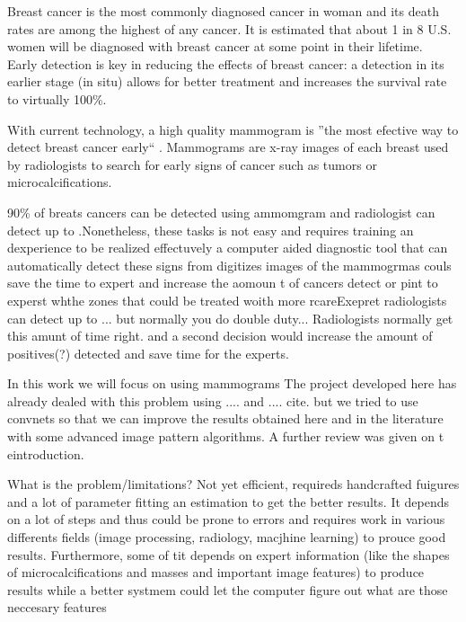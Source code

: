 Breast cancer is the most commonly diagnosed cancer in woman and its death rates are among the highest of any cancer. It is estimated that about 1 in 8 U.S. women will be diagnosed with breast cancer at some point in their lifetime.~\cite{CSR2014} Early detection is key in reducing the effects of breast cancer: a detection in its earlier stage (in situ) allows for better treatment and increases the survival rate to virtually 100\%.~\cite{CSR2014}

With current technology, a high quality mammogram is ''the most efective way to detect breast cancer early`` \cite{MammogramFactSheet2014}. Mammograms are x-ray images of each breast used by radiologists to search for early signs of cancer such as tumors or microcalcifications. 



90\% of breats cancers can be detected using  ammomgram and radiologist can detect up to .Nonetheless, these tasks is not easy and requires training an dexperience to be realized effectuvely  a computer aided diagnostic tool that can automatically detect these signs from digitizes images of the mammogrmas couls save the time to expert and increase the aomoun t of cancers detect or pint to experst whthe zones that could be treated woith more rcareExepret radiologists can detect up to ... but normally you do double duty... 
Radiologists normally get this amunt of time right. and a second decision would increase the amount of positives(?) detected and save time for the experts.

 
In this work we will focus on using mammograms
The project developed here has already dealed with this problem using .... and .... cite. but we tried to use convnets so that we can improve the results obtained here and in the literature with some advanced image pattern algorithms. A further review was given on t eintroduction.

What is the problem/limitations? Not yet efficient, requireds handcrafted fuigures and a lot of parameter fitting an estimation to get the better results. It depends on a lot of steps and thus could be prone to errors and requires work in various differents fields (image processing, radiology, macjhine learning) to prouce good results. Furthermore, some of tit depends on expert information (like the shapes of microcalcifications and masses and important image features) to produce results while a better systmem could let the computer figure out what are those neccesary features  

